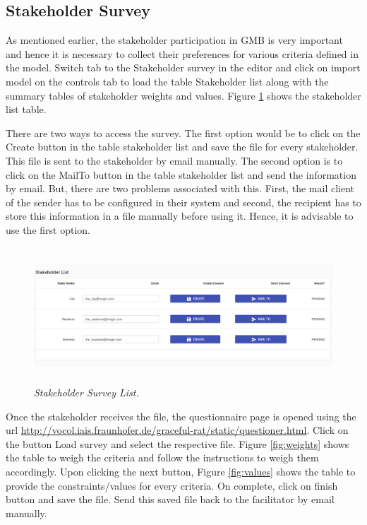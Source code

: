 \documentclass[a4paper]{article}
\begin{document}
\subsection{Stakeholder Survey}

As mentioned earlier, the stakeholder participation in GMB is very important and hence it is necessary to collect their preferences for various criteria defined in the model. Switch tab to the Stakeholder survey in the editor and click on import model on the controls tab to load the table Stakeholder list along with the summary tables of stakeholder weights and values. Figure \ref{fig:sList} shows the stakeholder list table.

There are two ways to access the survey. The first option would be to click on the Create button in the table stakeholder list and save the file for every stakeholder. This file is sent to the stakeholder by email manually. The second option is to click on the MailTo button in the table stakeholder list and send the information by email. But, there are two problems associated with this. First, the mail client of the sender has to be configured in their system and second, the recipient has to store this information in a file manually before using it. Hence, it is advisable to use the first option.

\begin{figure}[H]
\begin{center}
\includegraphics[height=2in,width=5in]{img/sList.png}
\caption{\small \sl Stakeholder Survey List.\label{fig:sList}}
\end{center}
\end{figure}

Once the stakeholder receives the file, the questionnaire page is opened using the url \url{http://vocol.iais.fraunhofer.de/graceful-rat/static/questioner.html}. Click on the button Load survey and select the respective file. Figure \ref{fig:weights} shows the table to weigh the criteria and follow the instructions to weigh them accordingly. Upon clicking the next button, Figure \ref{fig:values} shows the table to provide the constraints/values for every criteria. On complete, click on finish button and save the file. Send this saved file back to the facilitator by email manually.
\end{document}
